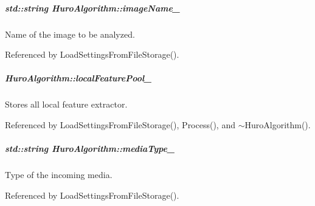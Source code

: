 \hypertarget{group___object_recognition_a2a752aeadf9fd6552473b42c2c3e6851}{
\subparagraph[{image\-Name\-\_\-}]{\setlength{\rightskip}{0pt plus 5cm}std\-::string Huro\-Algorithm\-::image\-Name\-\_\-\hspace{0.3cm}{\ttfamily [private]}}}\label{group___object_recognition_a2a752aeadf9fd6552473b42c2c3e6851}


Name of the image to be analyzed. 



Referenced by Load\-Settings\-From\-File\-Storage().

\hypertarget{group___object_recognition_a71f5e4605425060593f8ec4ce2381698}{
\subparagraph[{local\-Feature\-Pool\-\_\-}]{ Huro\-Algorithm\-::local\-Feature\-Pool\-\_\-\hspace{0.3cm}{\ttfamily [private]}}}\label{group___object_recognition_a71f5e4605425060593f8ec4ce2381698}


Stores all local feature extractor. 



Referenced by Load\-Settings\-From\-File\-Storage(), Process(), and $\sim$\-Huro\-Algorithm().

\hypertarget{group___object_recognition_a433b1ef87e917a1cdedc519dcc494837}{
\subparagraph[{media\-Type\-\_\-}]{\setlength{\rightskip}{0pt plus 5cm}std\-::string Huro\-Algorithm\-::media\-Type\-\_\-\hspace{0.3cm}{\ttfamily [private]}}}\label{group___object_recognition_a433b1ef87e917a1cdedc519dcc494837}


Type of the incoming media. 



Referenced by Load\-Settings\-From\-File\-Storage().


